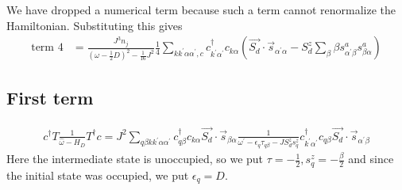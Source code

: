 \documentclass{revtex4-2}
\numberwithin{equation}{section}
\begin{document}
We have dropped a numerical term because such a term cannot renormalize the Hamiltonian. Substituting this gives
\begin{equation}\begin{aligned}
	\label{term2}
	\text{term 4} &= \frac{J^3 n_j}{\left(\omega - \frac{1}{2}D\right)^2 - \frac{1}{16}J^2} \frac{1}{4}\sum_{k k^\prime \alpha \alpha^\prime,c} c^\dagger_{k^\prime\alpha^\prime} c_{k\alpha} \left(\vec{S_d}\cdot\vec{s}_{\alpha^\prime\alpha} -S_d^z \sum_\beta \beta s^a_{\alpha^\prime\beta} s^a_{\beta\alpha} \right)
\end{aligned}\end{equation}

\subsection{First term}
\begin{align}
	c^\dagger T \frac{1}{\hat \omega - H_D}T^\dagger c = J^2\sum_{q\beta k k^\prime \alpha \alpha^\prime} c^\dagger_{q\beta} c_{k\alpha} \vec{S_d}\cdot\vec{s}_{\beta \alpha} \frac{1}{\omega^\prime - \epsilon_q\tau_{q\beta} - J S_d^z s_q^z}c^\dagger_{k^\prime\alpha^\prime} c_{q\beta} \vec{S_d}\cdot\vec{s}_{\alpha^\prime \beta}
\end{align}
Here the intermediate state is unoccupied, so we put \(\tau = -\frac{1}{2}, s_q^z = -\frac{\beta}{2}\) and since the initial state was occupied, we put \(\epsilon_q = D\).
\end{document}

